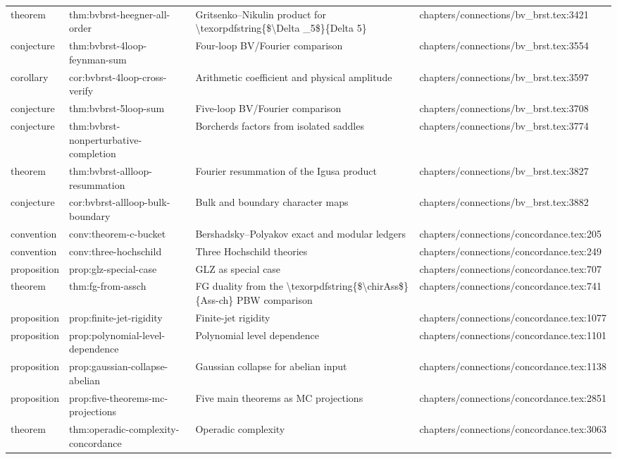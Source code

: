 \documentclass[11pt]{article}
\begin{document}
\begin{longtable}{L{0.10\textwidth}L{0.26\textwidth}L{0.42\textwidth}L{0.22\textwidth}}
theorem & thm:bvbrst-heegner-all-order & Gritsenko--Nikulin product for \textbackslash{}texorpdfstring\{\$\textbackslash{}Delta \_5\$\}\{Delta 5\} & chapters/connections/bv\_brst.tex:3421\\
conjecture & thm:bvbrst-4loop-feynman-sum & Four-loop BV/Fourier comparison & chapters/connections/bv\_brst.tex:3554\\
corollary & cor:bvbrst-4loop-cross-verify & Arithmetic coefficient and physical amplitude & chapters/connections/bv\_brst.tex:3597\\
conjecture & thm:bvbrst-5loop-sum & Five-loop BV/Fourier comparison & chapters/connections/bv\_brst.tex:3708\\
conjecture & thm:bvbrst-nonperturbative-completion & Borcherds factors from isolated saddles & chapters/connections/bv\_brst.tex:3774\\
theorem & thm:bvbrst-allloop-resummation & Fourier resummation of the Igusa product & chapters/connections/bv\_brst.tex:3827\\
conjecture & cor:bvbrst-allloop-bulk-boundary & Bulk and boundary character maps & chapters/connections/bv\_brst.tex:3882\\
convention & conv:theorem-c-bucket & Bershadsky--Polyakov exact and modular led{}gers & chapters/connections/concordance.tex:205\\
convention & conv:three-hochschild & Three Hochschild theories & chapters/connections/concordance.tex:249\\
proposition & prop:glz-special-case & GLZ as special case & chapters/connections/concordance.tex:707\\
theorem & thm:fg-from-assch & FG duality from the \textbackslash{}texorpdfstring\{\$\textbackslash{}chirAss\$\}\{Ass-ch\} PBW comparison & chapters/connections/concordance.tex:741\\
proposition & prop:finite-jet-rigidity & Finite-jet rigidity & chapters/connections/concordance.tex:1077\\
proposition & prop:polynomial-level-dependence & Polynomial level dependence & chapters/connections/concordance.tex:1101\\
proposition & prop:gaussian-collapse-abelian & Gaussian collapse for abelian input & chapters/connections/concordance.tex:1138\\
proposition & prop:five-theorems-mc-projections & Five main theorems as MC projections & chapters/connections/concordance.tex:2851\\
theorem & thm:operadic-complexity-concordance & Operadic complexity & chapters/connections/concordance.tex:3063\\

\end{longtable}
\end{document}

